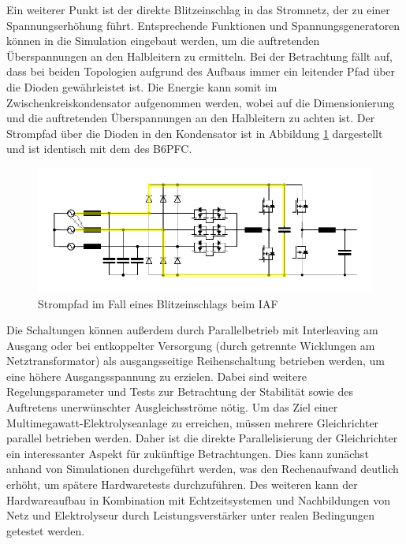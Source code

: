 Ein weiterer Punkt ist der direkte Blitzeinschlag in das Stromnetz, der zu einer Spannungserhöhung führt. Entsprechende Funktionen und Spannungsgeneratoren können in die Simulation eingebaut werden, um die auftretenden Überspannungen an den Halbleitern zu ermitteln. Bei der Betrachtung fällt auf, dass bei beiden Topologien aufgrund des Aufbaus immer ein leitender Pfad über die Dioden gewährleistet ist. Die Energie kann somit im Zwischenkreiskondensator aufgenommen werden, wobei auf die Dimensionierung und die auftretenden Überspannungen an den Halbleitern zu achten ist. Der Strompfad über die Dioden in den Kondensator ist in Abbildung \ref{fig:iafsurge} dargestellt und ist identisch mit dem des \gls{B6PFC}.
\begin{figure}[H]
	\centering
	\includegraphics[width=0.95\linewidth]{content/Grafiken/IAF_surge}
	\caption{Strompfad im Fall eines Blitzeinschlags beim IAF}
	\label{fig:iafsurge}
\end{figure}
Die Schaltungen können außerdem durch Parallelbetrieb mit Interleaving am Ausgang oder bei entkoppelter Versorgung (durch getrennte Wicklungen am Netztransformator) als ausgangsseitige Reihenschaltung betrieben werden, um eine höhere Ausgangsspannung zu erzielen. Dabei sind weitere Regelungsparameter und Tests zur Betrachtung der Stabilität sowie des Auftretens unerwünschter Ausgleichsströme nötig. Um das Ziel einer Multimegawatt-Elektrolyseanlage zu erreichen, müssen mehrere Gleichrichter parallel betrieben werden. Daher ist die direkte Parallelisierung der Gleichrichter ein interessanter Aspekt für zukünftige Betrachtungen. Dies kann zunächst anhand von Simulationen durchgeführt werden, was den Rechenaufwand deutlich erhöht, um spätere Hardwaretests durchzuführen. Des weiteren kann der Hardwareaufbau in Kombination mit Echtzeitsystemen und Nachbildungen von Netz und Elektrolyseur durch Leistungsverstärker unter realen Bedingungen getestet werden. \\
